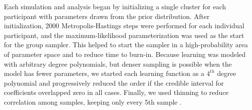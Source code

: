 \documentclass[12pt]{article}
\begin{document}
	Each simulation and analysis began by initializing a single cluster for each participant with parameters drawn from the prior distribution. After initialization, 2000 Metropolis-Hastings steps were performed for each individual participant, and the maximum-likelihood parameterization was used as the start for the group sampler. This helped to start the sampler in a high-probability area of parameter space and to reduce time to burn-in. Because learning was modeled with arbitrary degree polynomials, but denser sampling is possible when the model has fewer parameters, we started each learning function as a $4^{th}$ degree polynomial and progressively reduced the order if the credible interval for coefficients overlapped zero in all cases. Finally, we used thinning to reduce correlation among samples, keeping only every 5th sample \cite{Raftery1996}.



\clearpage
\end{document}
